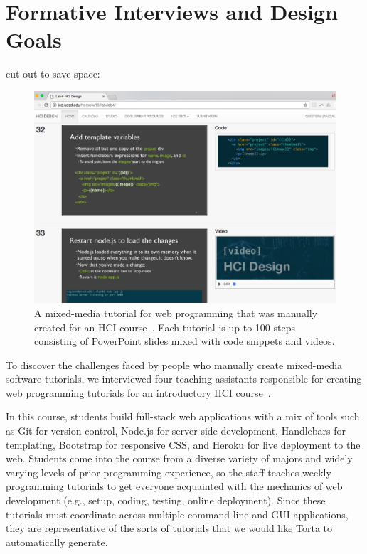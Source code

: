 
\section{Formative Interviews and Design Goals}

cut out to save space:

\begin{figure}
\includegraphics[width=\columnwidth]{figures/torta/ixd-lab-slides.jpg}

\caption{A mixed-media tutorial for web programming that was manually
created for an HCI course~{\protect \cite{ixd}}. Each tutorial is up to
100 steps consisting of PowerPoint slides mixed with code snippets and
videos.}

\vspace{-1em} %

\label{fig:ixd-lab-slides}
\end{figure}

To discover the challenges faced by people who manually create
mixed-media software tutorials, we interviewed four teaching
assistants responsible for creating web programming tutorials for an
introductory HCI course~\cite{ixd}.


In this course, students build full-stack web applications with a mix of
tools such as Git for version control, Node.js for server-side
development, Handlebars for templating, Bootstrap for responsive CSS,
and Heroku for live deployment to the web. Students come into the course
from a diverse variety of majors and widely varying levels of prior programming
experience, so the staff teaches weekly programming tutorials to get
everyone acquainted with the mechanics of web development (e.g., setup,
coding, testing, online deployment). Since these tutorials must
coordinate across multiple command-line and GUI applications, they are
representative of the sorts of tutorials that we would like Torta to
automatically generate.

